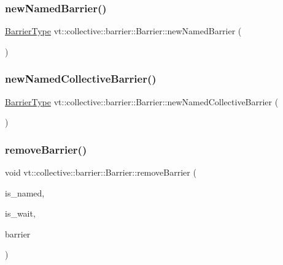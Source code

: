 \subsubsection{\texorpdfstring{new\+Named\+Barrier()}{newNamedBarrier()}}
{\footnotesize\ttfamily \hyperlink{namespacevt_a25e481f0d6bbc7204db23d1c87a62e77}{Barrier\+Type} vt\+::collective\+::barrier\+::\+Barrier\+::new\+Named\+Barrier (\begin{DoxyParamCaption}{ }\end{DoxyParamCaption})}

\mbox{\label{structvt_1_1collective_1_1barrier_1_1_barrier_a3e101519fbcfa9eee139bf02f991f085}} 
\subsubsection{\texorpdfstring{new\+Named\+Collective\+Barrier()}{newNamedCollectiveBarrier()}}
{\footnotesize\ttfamily \hyperlink{namespacevt_a25e481f0d6bbc7204db23d1c87a62e77}{Barrier\+Type} vt\+::collective\+::barrier\+::\+Barrier\+::new\+Named\+Collective\+Barrier (\begin{DoxyParamCaption}{ }\end{DoxyParamCaption})}

\mbox{\label{structvt_1_1collective_1_1barrier_1_1_barrier_a56128065b0b7735958b998dd97a4938b}} 
\subsubsection{\texorpdfstring{remove\+Barrier()}{removeBarrier()}}
{\footnotesize\ttfamily void vt\+::collective\+::barrier\+::\+Barrier\+::remove\+Barrier (\begin{DoxyParamCaption}\item[{bool const \&}]{is\+\_\+named,  }\item[{bool const \&}]{is\+\_\+wait,  }\item[{\hyperlink{namespacevt_a25e481f0d6bbc7204db23d1c87a62e77}{Barrier\+Type} const \&}]{barrier }\end{DoxyParamCaption})}

